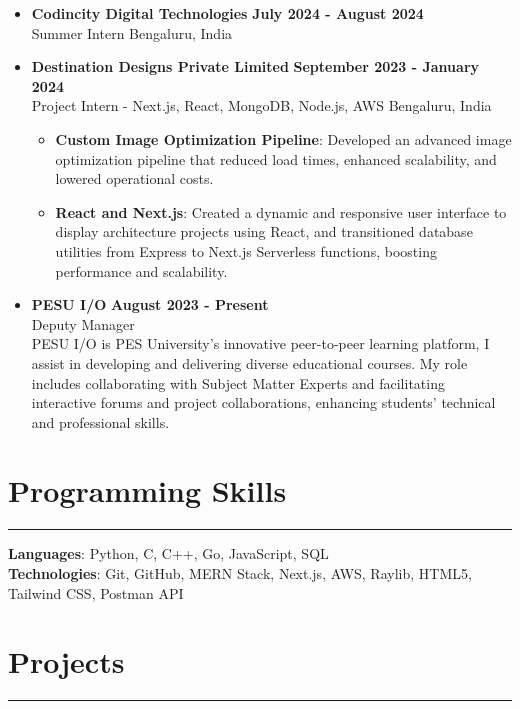 \documentclass[a4paper,10pt]{article}
\begin{document}
\begin{itemize}
    \item \textbf{Codincity Digital Technologies} \hfill \textbf{July 2024 - August 2024} \\
          Summer Intern \hfill Bengaluru, India
    \item \textbf{Destination Designs Private Limited} \hfill \textbf{September 2023 - January 2024} \\
          Project Intern - Next.js, React, MongoDB, Node.js, AWS \hfill Bengaluru, India
	      \begin{itemize}
		      \item \textbf{Custom Image Optimization Pipeline}: Developed an advanced image optimization pipeline that reduced load times, enhanced scalability, and lowered operational costs.
		      \item \textbf{React and Next.js}: Created a dynamic and responsive user interface to display architecture projects using React, and transitioned database utilities from Express to Next.js Serverless functions, boosting performance and scalability.
	      \end{itemize}
    \item \textbf{PESU I/O} \hfill \textbf{August 2023 - Present} \\ \vspace{0.5em}
    Deputy Manager \\
    PESU I/O is PES University's innovative peer-to-peer learning platform, I assist in developing and delivering diverse educational courses. My role includes collaborating with Subject Matter Experts and facilitating interactive forums and project collaborations, enhancing students' technical and professional skills.
\end{itemize}

\section*{Programming Skills}
\hrule
\vspace{0.5em}

\textbf{Languages}: Python, C, C++, Go, JavaScript, SQL \\
\textbf{Technologies}: Git, GitHub, MERN Stack, Next.js, AWS, Raylib, HTML5, Tailwind CSS, Postman API
\section*{Projects}
\hrule
\vspace{0.5em}
\end{document}
